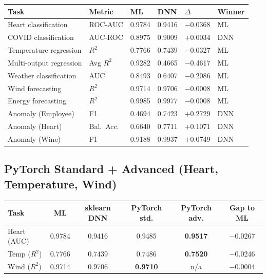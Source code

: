 \documentclass[11pt,a4paper]{article}
\begin{document}
\begin{center}
\small
\begin{tabular}{p{3.1cm} p{1.2cm} p{1.5cm} p{1.5cm} p{1.5cm} p{1.0cm}}
\toprule
\textbf{Task} & \textbf{Metric} & \textbf{ML} & \textbf{DNN} & \textbf{$\Delta$} & \textbf{Winner} \\
\midrule
Heart classification & ROC-AUC & 0.9784 & 0.9416 & $-$0.0368 & ML \\
COVID classification & AUC-ROC & 0.8975 & 0.9009 & +0.0034 & DNN \\
Temperature regression & $R^2$ & 0.7766 & 0.7439 & $-$0.0327 & ML \\
Multi-output regression & Avg $R^2$ & 0.9282 & 0.4665 & $-$0.4617 & ML \\
Weather classification & AUC & 0.8493 & 0.6407 & $-$0.2086 & ML \\
Wind forecasting & $R^2$ & 0.9714 & 0.9706 & $-$0.0008 & ML \\
Energy forecasting & $R^2$ & 0.9985 & 0.9977 & $-$0.0008 & ML \\
Anomaly (Employee) & F1 & 0.4694 & 0.7423 & +0.2729 & DNN \\
Anomaly (Heart) & Bal.\ Acc. & 0.6640 & 0.7711 & +0.1071 & DNN \\
Anomaly (Wine) & F1 & 0.9188 & 0.9937 & +0.0749 & DNN \\
\bottomrule
\end{tabular}
\end{center}

\subsection{PyTorch Standard + Advanced (Heart, Temperature, Wind)}

\begin{center}
\small
\begin{tabular}{lccccc}
\toprule
\textbf{Task} & \textbf{ML} & \textbf{sklearn DNN} & \textbf{PyTorch std.} & \textbf{PyTorch adv.} & \textbf{Gap to ML} \\
\midrule
Heart (AUC)  & 0.9784 & 0.9416 & 0.9485 & \textbf{0.9517} & $-$0.0267 \\
Temp ($R^2$) & 0.7766 & 0.7439 & 0.7486 & \textbf{0.7520} & $-$0.0246 \\
Wind ($R^2$) & 0.9714 & 0.9706 & \textbf{0.9710} & n/a & $-$0.0004 \\
\bottomrule
\end{tabular}
\end{center}
\end{document}
